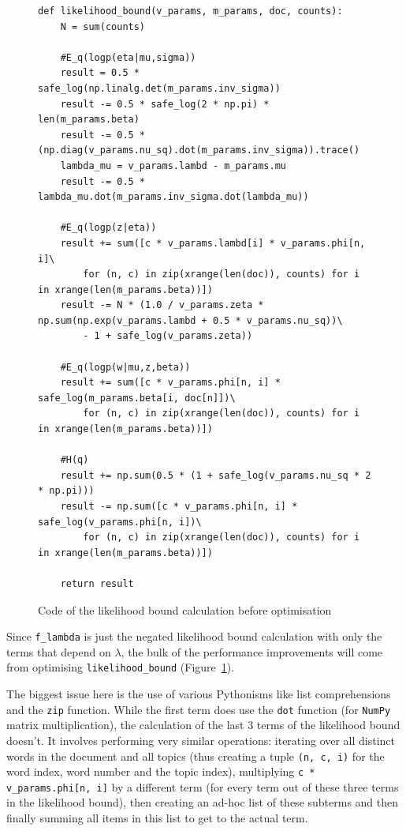 \documentclass[12pt,a4paper,twoside,openright]{report}
\begin{document}
\begin{figure}
\begin{Verbatim}[fontsize=\scriptsize]
def likelihood_bound(v_params, m_params, doc, counts):
    N = sum(counts)
    
    #E_q(logp(eta|mu,sigma))
    result = 0.5 * safe_log(np.linalg.det(m_params.inv_sigma))
    result -= 0.5 * safe_log(2 * np.pi) * len(m_params.beta)
    result -= 0.5 * (np.diag(v_params.nu_sq).dot(m_params.inv_sigma)).trace()
    lambda_mu = v_params.lambd - m_params.mu
    result -= 0.5 * lambda_mu.dot(m_params.inv_sigma.dot(lambda_mu))
    
    #E_q(logp(z|eta))
    result += sum([c * v_params.lambd[i] * v_params.phi[n, i]\
        for (n, c) in zip(xrange(len(doc)), counts) for i in xrange(len(m_params.beta))])
    result -= N * (1.0 / v_params.zeta * np.sum(np.exp(v_params.lambd + 0.5 * v_params.nu_sq))\
        - 1 + safe_log(v_params.zeta))
    
    #E_q(logp(w|mu,z,beta))
    result += sum([c * v_params.phi[n, i] * safe_log(m_params.beta[i, doc[n]])\
        for (n, c) in zip(xrange(len(doc)), counts) for i in xrange(len(m_params.beta))])
    
    #H(q)
    result += np.sum(0.5 * (1 + safe_log(v_params.nu_sq * 2 * np.pi)))
    result -= np.sum([c * v_params.phi[n, i] * safe_log(v_params.phi[n, i])\
        for (n, c) in zip(xrange(len(doc)), counts) for i in xrange(len(m_params.beta))])
    
    return result
\end{Verbatim}
\caption{Code of the likelihood bound calculation before optimisation}
\label{fig:code-before-optimisation}
\end{figure}

Since \texttt{f\_lambda} is just the negated likelihood bound calculation with only the terms that depend on $\lambda$, the bulk of the performance improvements will come from optimising \texttt{likelihood\_bound} (Figure~\ref{fig:code-before-optimisation}).

The biggest issue here is the use of various Pythonisms like list comprehensions and the \texttt{zip} function. While the first term does use the \texttt{dot} function (for \texttt{NumPy} matrix multiplication), the calculation of the last 3 terms of the likelihood bound doesn't. It involves performing very similar operations: iterating over all distinct words in the document and all topics (thus creating a tuple \texttt{(n, c, i)} for the word index, word number and the topic index), multiplying \texttt{c * v\_params.phi[n, i]} by a different term (for every term out of these three terms in the likelihood bound), then creating an ad-hoc list of these subterms and then finally summing all items in this list to get to the actual term.
\end{document}
